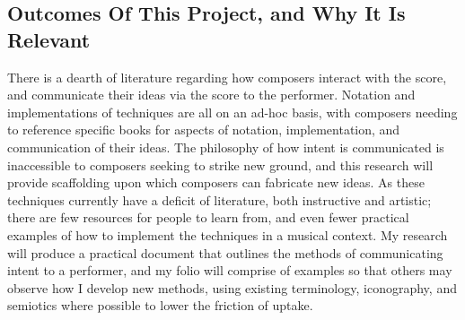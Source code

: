\subsection{Outcomes Of This Project, and Why It Is Relevant}

There is a dearth of literature regarding how composers interact with the score, and communicate their ideas via the score to the performer.
Notation and implementations of techniques are all on an ad-hoc basis, with composers needing to reference specific books for aspects of notation, implementation, and communication of their ideas.
The philosophy of how intent is communicated is inaccessible to composers seeking to strike new ground, and this research will provide scaffolding upon which composers can fabricate new ideas.
As these techniques currently have a deficit of literature, both instructive and artistic; there are few resources for people to learn from, and even fewer practical examples of how to implement the techniques in a musical context.
My research will produce a practical document that outlines the methods of communicating intent to a performer, and my folio will comprise of examples so that others may observe how I develop new methods, using existing terminology, iconography, and semiotics where possible to lower the friction of uptake.